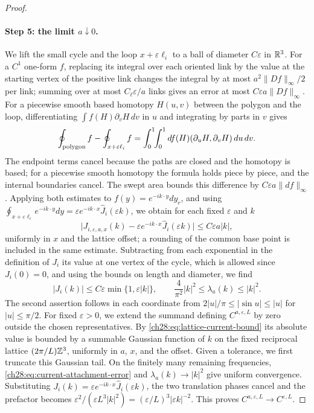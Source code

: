 \begin{proof}
\paragraph{Step 5: the limit $a\downarrow0$.}
We lift the small cycle and the loop $x+\varepsilon\ell_i$ to a ball of diameter $C\varepsilon$ in $\mathbb R^3$. For a $C^1$ one-form $f$, replacing its integral over each oriented link by the value at the starting vertex of the positive link changes the integral by at most $a^2\|Df\|_\infty/2$ per link; summing over at most $C_\ell\varepsilon/a$ links gives an error at most $C\varepsilon a\|Df\|_\infty$. For a piecewise smooth based homotopy $H(u,v)$ between the polygon and the loop, differentiating $\int f(H)\partial_vH\,dv$ in $u$ and integrating by parts in $v$ gives
\[
 \oint_{\rm polygon}f-\oint_{x+\varepsilon\ell_i}f=\int_0^1\!\!\int_0^1df(H)(\partial_uH,\partial_vH)\,du\,dv.
\]
The endpoint terms cancel because the paths are closed and the homotopy is based; for a piecewise smooth homotopy the formula holds piece by piece, and the internal boundaries cancel. The swept area bounds this difference by $C\varepsilon a\|df\|_\infty$. Applying both estimates to $f(y)=e^{-ik\cdot y}dy_r$, and using $\oint_{x+\varepsilon\ell_i}e^{-ik\cdot y}dy=\varepsilon e^{-ik\cdot x}\widehat J_i(\varepsilon k)$, we obtain for each fixed $\varepsilon$ and $k$
\begin{equation}\label{ch28:eq:current-attachment-error}
 \bigl|J_{i,\varepsilon,a,x}(k)-\varepsilon e^{-ik\cdot x}\widehat J_i(\varepsilon k)\bigr|\le C\varepsilon a|k|,
\end{equation}
uniformly in $x$ and the lattice offset; a rounding of the common base point is included in the same estimate. Subtracting from each exponential in the definition of $J_i$ its value at one vertex of the cycle, which is allowed since $J_i(0)=0$, and using the bounds on length and diameter, we find
\begin{equation}\label{ch28:eq:lattice-current-bound}
 |J_i(k)|\le C\varepsilon\min\{1,\varepsilon|k|\},\qquad \frac4{\pi^2}|k|^2\le\lambda_a(k)\le|k|^2.
\end{equation}
The second assertion follows in each coordinate from $2|u|/\pi\le|\sin u|\le|u|$ for $|u|\le\pi/2$. For fixed $\varepsilon>0$, we extend the summand defining $C^{a,\varepsilon,L}$ by zero outside the chosen representatives. By \eqref{ch28:eq:lattice-current-bound} its absolute value is bounded by a summable Gaussian function of $k$ on the fixed reciprocal lattice $(2\pi/L)\mathbb Z^3$, uniformly in $a$, $x$, and the offset. Given a tolerance, we first truncate this Gaussian tail. On the finitely many remaining frequencies, \eqref{ch28:eq:current-attachment-error} and $\lambda_a(k)\to|k|^2$ give uniform convergence. Substituting $J_i(k)=\varepsilon e^{-ik\cdot x}\widehat J_i(\varepsilon k)$, the two translation phases cancel and the prefactor becomes $\varepsilon^2/(\varepsilon L^3|k|^2)=(\varepsilon/L)^3|\varepsilon k|^{-2}$. This proves $C^{a,\varepsilon,L}\to C^{\varepsilon,L}$.


\end{proof}

